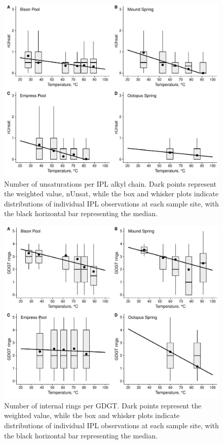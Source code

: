 \singlespace
\begin{figure}[h]
\centering
\includegraphics[width=1\linewidth]{"figs_ch1/boxplot - alkyl chain nUnsat"}
\caption[Number of unsaturations per IPL alkyl chain]{Number of unsaturations per IPL alkyl chain. Dark points represent the weighted value, nUnsat, while the box and whisker plots indicate distributions of individual IPL observations at each sample site, with the black horizontal bar representing the median.}
\label{fig:nUnsat}
\end{figure}
\doublespace


\singlespace
\begin{figure}[h]
\centering
\includegraphics[width=1\linewidth]{"figs_ch1/boxplot - alkyl chain nRings"}
\caption[Number of internal rings per GDGT]{Number of internal rings per GDGT. Dark points represent the weighted value, while the box and whisker plots indicate distributions of individual IPL observations at each sample site, with the black horizontal bar representing the median.}
\label{fig:nRings}
\end{figure}
\doublespace